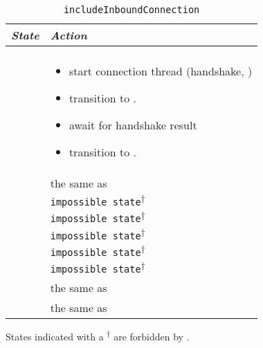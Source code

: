 \begin{table}
  \begin{tabular}[h]{ll}
    \textit{State}           & \textit{Action} \\\hline\\[2pt]
    \InitialState{}          &
      \begin{minipage}[t]{8cm}
        \begin{itemize}
          \item start connection thread (handshake, \mux{})
          \item transition to \UnnegotiatedStateIn{}.
          \item await for handshake result
          \item transition to \InboundIdleStateAny{}.
        \end{itemize}
      \end{minipage}
      \vspace{8pt}\\
    \ReservedOutboundState{} & the same as \InitialState{} \\[8pt]
    \UnnegotiatedStateAny{}  & \texttt{impossible state}\textsuperscript{$\dagger$} \\[8pt]
    \InboundIdleStateAny{}   & \texttt{impossible state}\textsuperscript{$\dagger$} \\[8pt]
    \InboundStateAny{}       & \texttt{impossible state}\textsuperscript{$\dagger$} \\[8pt]
    \OutboundStateAny{}      & \texttt{impossible state}\textsuperscript{$\dagger$} \\[8pt]
    \DuplexState{}           & \texttt{impossible state}\textsuperscript{$\dagger$} \\[8pt]
    \TerminatingState{}      & the same as \InitialState{} \\[8pt]
    \TerminatedState{}       & the same as \InitialState{} \\[8pt]
  \end{tabular}
  \caption{\texttt{includeInboundConnection}}
  \label{table:includeInboundConnection}
\end{table}
States indicated with a \textsuperscript{$\dagger$} are forbidden by \TCP{}.

